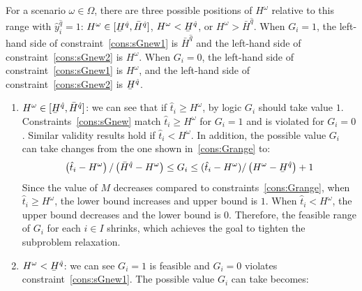 \documentclass[11pt]{article}
\renewcommand{\underbar}{\underaccent{\bar}}
\begin{document}
	For a scenario \(\omega \in \Omega\), there are three possible positions of \(H^\omega\) relative to this range with \(\hat{y}_i^{\hat{q}} = 1\): 
	\(H^\omega \in [\underbar{H}^{\hat{q}},\bar{H}^{\hat{q}}]\), \(H^\omega < \underbar{H}^{\hat{q}}\), or \(H^\omega > \bar{H}^{\hat{q}}\). 
	When \(G_i = 1\), the left-hand side of constraint~\eqref{cons:sGnew1} is \(\bar{H}^{\hat{q}}\) and the left-hand side of constraint~\eqref{cons:sGnew2} is \(H^\omega\). When \(G_i = 0\), the left-hand side of constraint~\eqref{cons:sGnew1} is \(H^\omega\), and the left-hand side of constraint~\eqref{cons:sGnew2} is 
	\(\underbar{H}^{\hat{q}}\).
	\begin{enumerate}
		\item 
			\(H^\omega \in
			 [\underbar{H}^{\hat{q}},\bar{H}^{\hat{q}}]\): 
			 we can see that if \(\hat{t}_i \geq H^\omega\), by logic \(G_i\) should take value \(1\). Constraints~\eqref{cons:sGnew} match \(\hat{t}_i \geq H^\omega\) for \(G_i = 1\) and is violated for \(G_i = 0\). Similar validity results hold if \(\hat{t}_i < H^\omega\). In addition, the possible value \(G_i\) can take changes from the one shown in~\eqref{cons:Grange} to:
			\begin{equation}
			\left(\hat{t}_i - H^\omega \right)/\left( \bar{H}^{\hat{q}} - H^\omega \right) \leq G_i \leq (\hat{t}_i - H^\omega)/\left(H^\omega - \underbar{H}^{\hat{q}} \right) + 1 \label{cons:case1}
			\end{equation}
			Since the value of \(M\) decreases compared to constraints~\eqref{cons:Grange}, when \(\hat{t}_i \geq H^\omega\), the lower bound increases and upper bound is \(1\). When \(\hat{t}_i < H^\omega\), the upper bound decreases and the lower bound is \(0\). Therefore, the feasible range of \(G_i\) for each \(i \in I\) shrinks, which achieves the goal to tighten the subproblem relaxation.
		\item 
			\(H^\omega < \underbar{H}^{\hat{q}}\): 
			we can see \(G_i = 1\) is feasible and \(G_i = 0\) violates constraint~\eqref{cons:sGnew1}. The possible value \(G_i\) can take becomes:

\end{enumerate}
\end{document}
